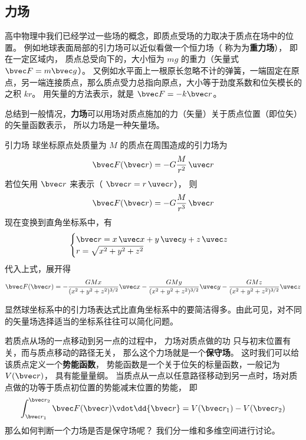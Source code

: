 

\subsection{力场}
高中物理中我们已经学过一些场的概念，即质点受场的力取决于质点在场中的位置。 例如地球表面局部的引力场可以近似看做一个恒力场（ 称为为\textbf{重力场}）， 即在一定区域内， 质点总受向下的，大小恒为 $mg$ 的重力（矢量式 $\bvec F = m\bvec g$）。 又例如水平面上一根原长忽略不计的弹簧，一端固定在原点，另一端连接质点，那么质点受力总指向原点，大小等于劲度系数和位矢模长的之积 $kr$。 用矢量的方法表示，就是 $\bvec F = -k\bvec r$。

总结到一般情况，\textbf{力场}可以用场对质点施加的力（矢量）关于质点位置（即位矢）的矢量函数表示， 所以力场是一种矢量场。


\begin{example}{引力场}\label{V_ex1}
球坐标原点处质量为 $M$ 的质点在周围造成的引力场为
\begin{equation}
\bvec F(\bvec r) =  - G\frac{M}{r^2}\,\uvec r
\end{equation} 
若位矢用 $\bvec r$ 来表示（ $\bvec r = r\,\uvec r$）， 则
\begin{equation}
\bvec F(\bvec r) =  - G\frac{M}{r^3}\,\bvec r
\end{equation}
现在变换到直角坐标系中，有
\begin{equation}
\begin{cases}
\bvec r = x\,\uvec x + y\,\uvec y + z\,\uvec z\\
r = \sqrt{x^2 + y^2 + z^2} 
\end{cases}
\end{equation} 
代入上式，展开得
\begin{equation}
\bvec F(\bvec r) =  - \frac{GMx}{(x^2+y^2+z^2)^{3/2}}\uvec x - \frac{GMy}{(x^2 +y^2+z^2)^{3/2}}\uvec y - \frac{GMz}{(x^2+y^2+z^2)^{3/2}}\uvec z 
\end{equation} 

显然球坐标系中的引力场表达式比直角坐标系中的要简洁得多。由此可见，对不同的矢量场选择适当的坐标系往往可以简化问题。
\end{example}

若质点从场的一点移动到另一点的过程中， 力场对质点做的功 只与初末位置有关，而与质点移动的路径无关， 那么这个力场就是一个\textbf{保守场}。 这时我们可以给该质点定义一个\textbf{势能函数}， 势能函数是一个关于位矢的标量函数，一般记为 $V(\bvec r)$， 具有能量量纲。 当质点从一点以任意路径移动到另一点时，场对质点做的功等于质点初位置的势能减末位置的势能， 即
\begin{equation}\label{V_eq1}
\int_{\bvec r_1}^{\bvec r_2} \bvec F(\bvec r) \vdot \dd{\bvec r} = V(\bvec r_1)-V(\bvec r_2)
\end{equation}
那么如何判断一个力场是否是保守场呢？ 我们分一维和多维空间进行讨论。

